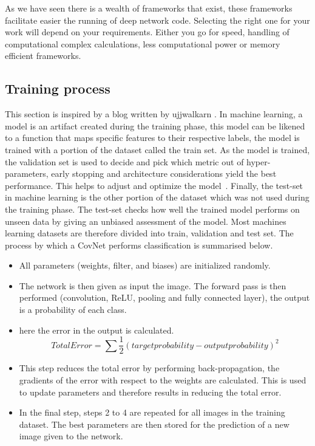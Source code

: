 \documentclass[12pt, a4paper,oneside]{report}
\begin{document}
As we have seen there is a wealth of frameworks that exist, these frameworks facilitate easier the running of deep network code. Selecting the right one for your work will depend on your requirements. Either you go for speed, handling of computational complex calculations, less computational power or memory efficient frameworks.

\subsection{Training process}
This section is inspired by a blog written by ujjwalkarn \cite{cnnonline}. In machine learning, a model is an artifact created during the training phase, this model can be likened to a function that maps specific features to their respective labels, the model is trained with a portion of the dataset called the train set. As the model is trained, the validation set is used to decide and pick which metric out of hyper-parameters, early stopping and architecture considerations yield the best performance. This helps to adjust and optimize the model~\cite{validation}. Finally, the test-set in machine learning is the other portion of the dataset which was not used during the training phase. The test-set checks how well the trained model performs on unseen data by giving an unbiased assessment of the model. Most machines learning datasets are therefore divided into train, validation and test set.
The process by which a CovNet performs classification is summarised below.

\begin{itemize}
	\item All parameters (weights, filter, and biases) are initialized randomly.
	\item The network is then given as input the image. The forward pass is then performed (convolution, ReLU, pooling and fully connected layer), the output is a probability of each class.
	\item here the error in the output is calculated.
	\[Total Error = \sum  \frac{1}{2} (target probability - output probability) ^2 \]
	\item This step reduces the total error by performing back-propagation, the gradients of the error with respect to the weights are calculated. This is used to update parameters and therefore results in reducing the total error.
	\item In the final step, steps 2 to 4 are repeated for all images in the training dataset. The best parameters are then stored for the prediction of a new image given to the network. 
	
\end{itemize} 
\end{document}
